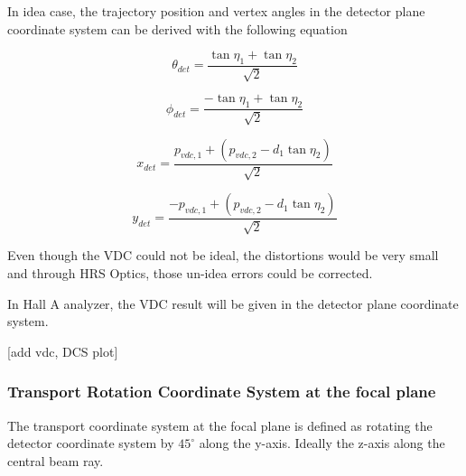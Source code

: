 
In idea case, the trajectory position and vertex angles in the detector plane coordinate system can be derived with the following equation 

\begin{equation}
    \theta_{det} = \frac{\tan{\eta_1} + \tan{\eta_2}}{\sqrt{2}}
\end{equation}
    
\begin{equation}
    \phi_{det} =  \frac{-\tan{\eta_1} + \tan{\eta_2}}{\sqrt{2}}
\end{equation}

\begin{equation}
    x_{det} = \frac{p_{vdc,1} + (p_{vdc,2} - d_1\tan{\eta_2})}{\sqrt{2}}
\end{equation}

\begin{equation}
    y_{det} = \frac{-p_{vdc,1} + (p_{vdc,2} - d_1\tan{\eta_2})}{\sqrt{2}}
\end{equation}

Even though the VDC could not be ideal, the distortions would be very small and through HRS Optics, those un-idea errors could be corrected. 

In Hall A analyzer, the VDC result will be given in the detector plane coordinate system.

[add vdc, DCS plot]

\subsubsection{Transport Rotation Coordinate System at the focal plane}
The transport coordinate system at the focal plane is defined as rotating the detector coordinate system by $45^{\circ}$ along the y-axis. Ideally the z-axis along the central beam ray. 

